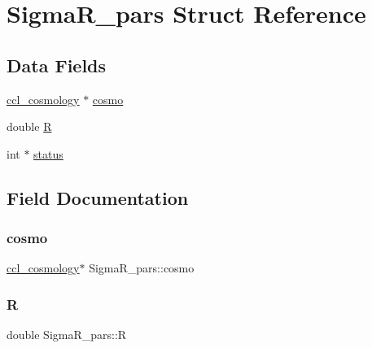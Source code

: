 \hypertarget{struct_sigma_r__pars}{}\section{Sigma\+R\+\_\+pars Struct Reference}
\label{struct_sigma_r__pars}
\subsection*{Data Fields}
\begin{DoxyCompactItemize}
\item 
\mbox{\hyperlink{structccl__cosmology}{ccl\+\_\+cosmology}} $\ast$ \mbox{\hyperlink{struct_sigma_r__pars_a5b7d34c426edb1b852e988a3000c3428}{cosmo}}
\item 
double \mbox{\hyperlink{struct_sigma_r__pars_a5ca4018002321f1d82275eead610f0bd}{R}}
\item 
int $\ast$ \mbox{\hyperlink{struct_sigma_r__pars_ac844a04f7d5a92c27afdb351d7055dd3}{status}}
\end{DoxyCompactItemize}


\subsection{Field Documentation}
\mbox{\label{struct_sigma_r__pars_a5b7d34c426edb1b852e988a3000c3428}} 
\subsubsection{\texorpdfstring{cosmo}{cosmo}}
{\footnotesize\ttfamily \mbox{\hyperlink{structccl__cosmology}{ccl\+\_\+cosmology}}$\ast$ Sigma\+R\+\_\+pars\+::cosmo}

\mbox{\label{struct_sigma_r__pars_a5ca4018002321f1d82275eead610f0bd}} 
\subsubsection{\texorpdfstring{R}{R}}
{\footnotesize\ttfamily double Sigma\+R\+\_\+pars\+::R}

\mbox{\label{struct_sigma_r__pars_ac844a04f7d5a92c27afdb351d7055dd3}} 
